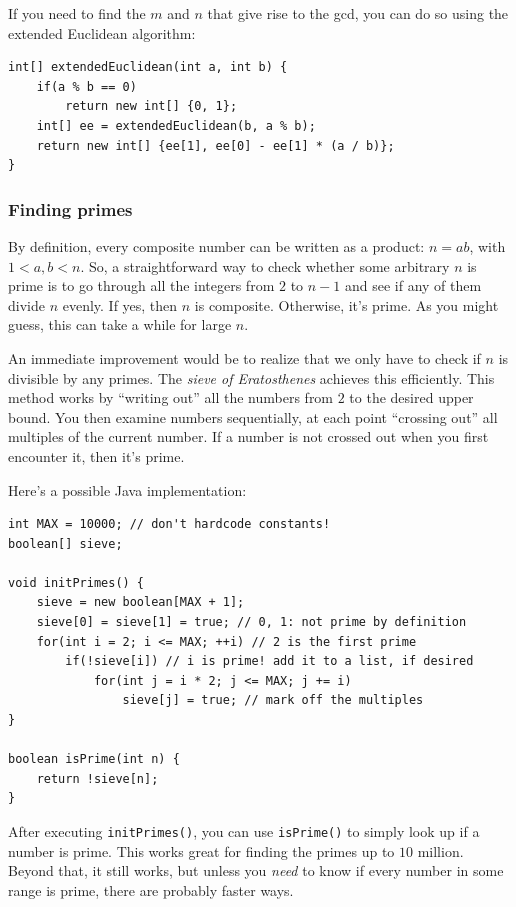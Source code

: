 \documentclass[a4paper,12pt]{article}
\begin{document}
If you need to find the $m$ and $n$ that give rise to the gcd, you can do so using the extended Euclidean algorithm:
\begin{lstlisting}
int[] extendedEuclidean(int a, int b) {
	if(a % b == 0)
		return new int[] {0, 1};
	int[] ee = extendedEuclidean(b, a % b);
	return new int[] {ee[1], ee[0] - ee[1] * (a / b)};
}
\end{lstlisting}

\subsubsection{Finding primes}

By definition, every composite number can be written as a product: $n=ab$, with $1 < a,b < n$. So, a straightforward way to check whether some arbitrary $n$ is prime is to go through all the integers from $2$ to $n-1$ and see if any of them divide $n$ evenly. If yes, then $n$ is composite. Otherwise, it's prime. As you might guess, this can take a while for large $n$.

An immediate improvement would be to realize that we only have to check if $n$ is divisible by any primes. The {\em sieve of Eratosthenes} achieves this efficiently. This method works by ``writing out'' all the numbers from $2$ to the desired upper bound. You then examine numbers sequentially, at each point ``crossing out'' all multiples of the current number. If a number is not crossed out when you first encounter it, then it's prime. 

Here's a possible Java implementation:

\begin{lstlisting}
int MAX = 10000; // don't hardcode constants!
boolean[] sieve;

void initPrimes() {
	sieve = new boolean[MAX + 1];
	sieve[0] = sieve[1] = true; // 0, 1: not prime by definition
	for(int i = 2; i <= MAX; ++i) // 2 is the first prime
		if(!sieve[i]) // i is prime! add it to a list, if desired
			for(int j = i * 2; j <= MAX; j += i)
				sieve[j] = true; // mark off the multiples
}

boolean isPrime(int n) {
	return !sieve[n];
}
\end{lstlisting}

\noindent After executing \lstinline/initPrimes()/, you can use \lstinline/isPrime()/ to simply look up if a number is prime. This works great for finding the primes up to $10$ million. Beyond that, it still works, but unless you {\em need} to know if every number in some range is prime, there are probably faster ways.
\end{document}

